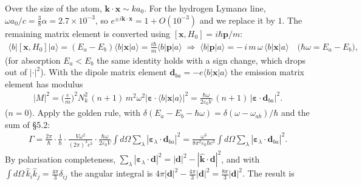 \documentclass[letterpaper,10pt,english]{jupyterBook}
\begin{document}
\sphinxAtStartPar
{} Over the size of the atom, \(\mathbf k\!\cdot\!\mathbf x\sim ka_0\). For the hydrogen Lyman\sphinxhyphen{}\(\alpha\) line, \(\omega a_0/c=\tfrac38\alpha=2.7\times10^{-3}\), so \(e^{\pm i\mathbf k\cdot\mathbf x}=1+O(10^{-3})\) and we replace it by \(1\). The remaining matrix element is converted using \([\mathbf x,H_0]=i\hbar\mathbf p/m\):
\begin{equation*}
\begin{split}
\langle b|[\mathbf x,H_0]|a\rangle=(E_a-E_b)\langle b|\mathbf x|a\rangle=\frac{i\hbar}{m}\langle b|\mathbf p|a\rangle
\;\Longrightarrow\;
\langle b|\mathbf p|a\rangle=-\,i\,m\,\omega\,\langle b|\mathbf x|a\rangle\quad\big(\hbar\omega=E_a-E_b\big),
\end{split}
\end{equation*}
\sphinxAtStartPar
(for absorption \(E_a<E_b\) the same identity holds with a sign change, which drops out of \(|\cdot|^2\)). With the dipole matrix element \(\mathbf d_{ba}=-e\langle b|\mathbf x|a\rangle\) the emission matrix element has modulus
\begin{equation*}
\begin{split}
|M|^2=\Big(\frac em\Big)^2N_k^2\,(n+1)\,m^2\omega^2|\boldsymbol\varepsilon\!\cdot\!\langle b|\mathbf x|a\rangle|^2=\frac{\hbar\omega}{2\varepsilon_0V}\,(n+1)\,|\boldsymbol\varepsilon\!\cdot\!\mathbf d_{ba}|^2 .
\end{split}
\end{equation*}
\sphinxAtStartPar
{} (\(n=0\)). Apply the golden rule, with \(\delta(E_a-E_b-\hbar\omega)=\delta(\omega-\omega_{ab})/\hbar\) and the sum of §5.2:
\begin{equation*}
\begin{split}
\Gamma=\frac{2\pi}{\hbar}\cdot\frac{1}{\hbar}\cdot\frac{V\omega^2}{(2\pi)^3c^3}\cdot\frac{\hbar\omega}{2\varepsilon_0V}\int d\Omega\sum_\lambda|\boldsymbol\varepsilon_\lambda\!\cdot\!\mathbf d_{ba}|^2
=\frac{\omega^3}{8\pi^2\varepsilon_0\hbar c^3}\int d\Omega\sum_\lambda|\boldsymbol\varepsilon_\lambda\!\cdot\!\mathbf d_{ba}|^2 .
\end{split}
\end{equation*}
\sphinxAtStartPar
By polarisation completeness, \(\sum_\lambda|\boldsymbol\varepsilon_\lambda\!\cdot\!\mathbf d|^2=|\mathbf d|^2-|\hat{\mathbf k}\!\cdot\!\mathbf d|^2\), and with \(\int d\Omega\,\hat k_i\hat k_j=\tfrac{4\pi}{3}\delta_{ij}\) the angular integral is \(4\pi|\mathbf d|^2-\tfrac{4\pi}{3}|\mathbf d|^2=\tfrac{8\pi}{3}|\mathbf d|^2\). The result is
\end{document}

